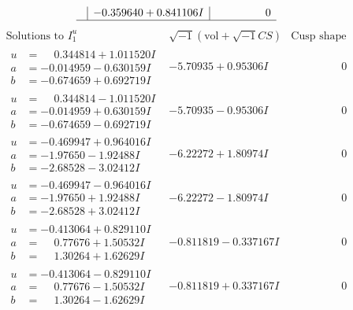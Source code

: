 \documentclass[1p]{elsarticle_modified}
\theoremstyle{definition}
\newcommand{\I}{\sqrt{-1}}
\begin{document}
$$\begin{array}{c|c|c}
 & -0.359640 + 0.841106 I & \phantom{-0.000000 } 0\\
 \hline 
 \end{array}$$\newpage$$\begin{array}{c|c|c}  
\text{Solutions to }I^u_{1}& \I (\text{vol} + \sqrt{-1}CS) & \text{Cusp shape}\\
 \hline 
\begin{aligned}
u &= \phantom{-}0.344814 + 1.011520 I \\
a &= -0.014959 - 0.630159 I \\
b &= -0.674659 + 0.692719 I\end{aligned}
 & -5.70935 + 0.95306 I & \phantom{-0.000000 } 0 \\ \hline\begin{aligned}
u &= \phantom{-}0.344814 - 1.011520 I \\
a &= -0.014959 + 0.630159 I \\
b &= -0.674659 - 0.692719 I\end{aligned}
 & -5.70935 - 0.95306 I & \phantom{-0.000000 } 0 \\ \hline\begin{aligned}
u &= -0.469947 + 0.964016 I \\
a &= -1.97650 - 1.92488 I \\
b &= -2.68528 - 3.02412 I\end{aligned}
 & -6.22272 + 1.80974 I & \phantom{-0.000000 } 0 \\ \hline\begin{aligned}
u &= -0.469947 - 0.964016 I \\
a &= -1.97650 + 1.92488 I \\
b &= -2.68528 + 3.02412 I\end{aligned}
 & -6.22272 - 1.80974 I & \phantom{-0.000000 } 0 \\ \hline\begin{aligned}
u &= -0.413064 + 0.829110 I \\
a &= \phantom{-}0.77676 + 1.50532 I \\
b &= \phantom{-}1.30264 + 1.62629 I\end{aligned}
 & -0.811819 - 0.337167 I & \phantom{-0.000000 } 0 \\ \hline\begin{aligned}
u &= -0.413064 - 0.829110 I \\
a &= \phantom{-}0.77676 - 1.50532 I \\
b &= \phantom{-}1.30264 - 1.62629 I\end{aligned}
 & -0.811819 + 0.337167 I & \phantom{-0.000000 } 0 \\ \hline\begin{aligned}

\end{aligned}
\end{array}$$
\end{document}

